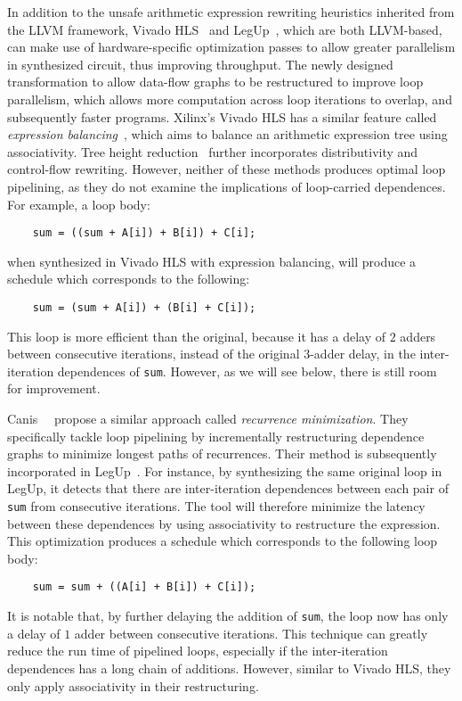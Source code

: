 In addition to the unsafe arithmetic expression rewriting heuristics inherited
from the LLVM framework, Vivado HLS~\cite{vivado_hls} and LegUp~\cite{legup},
which are both LLVM-based, can make use of hardware-specific optimization
passes to allow greater parallelism in synthesized circuit, thus improving
throughput.  The newly designed transformation to allow data-flow graphs to be
restructured to improve loop parallelism, which allows more computation across
loop iterations to overlap, and subsequently faster programs.  Xilinx's Vivado
HLS has a similar feature called \emph{expression balancing}~\cite{vivado_hls},
which aims to balance an arithmetic expression tree using associativity.  Tree
height reduction~\cite{nicolau91} further incorporates distributivity and
control-flow rewriting.  However, neither of these methods produces optimal
loop pipelining, as they do not examine the implications of loop-carried
dependences.  For example, a loop body:
\begin{lstlisting}
    sum = ((sum + A[i]) + B[i]) + C[i];
\end{lstlisting}\vspace{-15pt}
when synthesized in Vivado HLS with expression balancing, will produce a
schedule which corresponds to the following:
\begin{lstlisting}
    sum = (sum + A[i]) + (B[i] + C[i]);
\end{lstlisting}\vspace{-15pt}
This loop is more efficient than the original, because it has a delay of $2$
adders between consecutive iterations, instead of the original $3$-adder delay,
in the inter-iteration dependences of \verb|sum|.  However, as we will see
below, there is still room for improvement.

Canis~\etal~\cite{canis14} propose a similar approach called \emph{recurrence
minimization}.  They specifically tackle loop pipelining by incrementally
restructuring dependence graphs to minimize longest paths of recurrences.
Their method is subsequently incorporated in LegUp~\cite{legup}.  For instance,
by synthesizing the same original loop in LegUp, it detects that there are
inter-iteration dependences between each pair of \verb|sum| from consecutive
iterations.  The tool will therefore minimize the latency between these
dependences by using associativity to restructure the expression.  This
optimization produces a schedule which corresponds to the following loop body:
\begin{lstlisting}
    sum = sum + ((A[i] + B[i]) + C[i]);
\end{lstlisting}\vspace{-15pt}
It is notable that, by further delaying the addition of \verb|sum|, the loop
now has only a delay of $1$ adder between consecutive iterations.  This
technique can greatly reduce the run time of pipelined loops, especially if the
inter-iteration dependences has a long chain of additions.  However, similar to
Vivado HLS, they only apply associativity in their restructuring.

